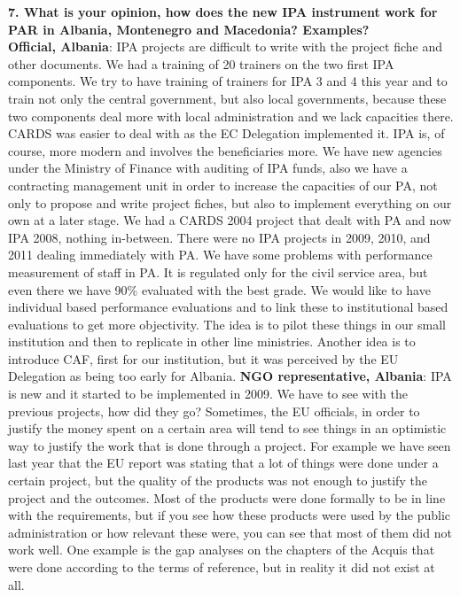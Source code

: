 \textbf{7. What is your opinion, how does the new IPA instrument work for PAR in Albania, Montenegro and Macedonia? Examples?}\\
\textbf{Official, Albania}: IPA projects are difficult to write with the project fiche and other documents. We had a training of 20 trainers on the two first IPA components. We try to have training of trainers for IPA 3 and 4 this year and to train not only the central government, but also local governments, because these two components deal more with local administration and we lack capacities there. CARDS was easier to deal with as the EC Delegation implemented it. IPA is, of course, more modern and involves the beneficiaries more. We have new agencies under the Ministry of Finance with auditing of IPA funds, also we have a contracting management unit in order to increase the capacities of our PA, not only to propose and write project fiches, but also to implement everything on our own at a later stage. We had a CARDS 2004 project that dealt with PA and now IPA 2008, nothing in-between. There were no IPA projects in 2009, 2010, and 2011 dealing immediately with PA. We have some problems with performance measurement of staff in PA. It is regulated only for the civil service area, but even there we have 90\% evaluated with the best grade. We would like to have individual based performance evaluations and to link these to institutional based evaluations to get more objectivity. The idea is to pilot these things in our small institution and then to replicate in other line ministries. Another idea is to introduce CAF, first for our institution, but it was perceived by the EU Delegation as being too early for Albania.
\textbf{NGO representative, Albania}: IPA is new and it started to be implemented in 2009. We have to see with the previous projects, how did they go? Sometimes, the EU officials, in order to justify the money spent on a certain area will tend to see things in an optimistic way to justify the work that is done through a project. For example we have seen last year that the EU report was stating that a lot of things were done under a certain project, but the quality of the products was not enough to justify the project and the outcomes. Most of the products were done formally to be in line with the requirements, but if you see how these products were used by the public administration or how relevant these were, you can see that most of them did not work well. One example is the gap analyses on the chapters of the Acquis that were done according to the terms of reference, but in reality it did not exist at all.
